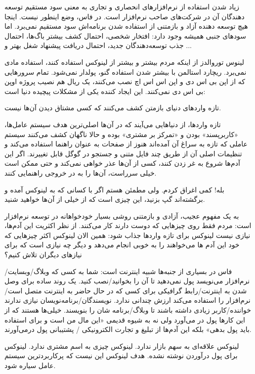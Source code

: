 زیاد شدن استفاده از نرم‌افزارهای انحصاری و تجاری به معنی سود مستقیم توسعه دهندگان آن در شرکت‌های صاحب نرم‌افزار است. در فاس، وضع اینطور نیست. اینجا هیچ توسعه دهنده آزاد و بازمتنی از استفاده شدن برنامه‌اش سود مستقیم نمی‌برد. اما سودهای جنبی همیشه وجود دارد: افتخار شخصی، احتمال کشف بیشتر باگ‌ها، احتمال جذب توسعه‌دهندگان جدید، احتمال دریافت پیشنهاد شغل بهتر و ...

لینوس توروالدز از اینکه مردم بیشتر و بیشتر از لینوکس استفاده کنند، استفاده مادی نمی‌برد. ریچارد استالمن با بیشتر شدن استفاده گنو، پولدار نمی‌شود. تمام سرورهایی که از اپن بی اس دی و اپن اس اس اچ نصب می‌کنند، یک ریال هم نصیب پروژه اوپن بی اس دی نمی‌کنند. این ایجاد کننده یکی از مشکلات‌ پیچیده دنیا است:

تازه واردهای دنیای بازمتن کشف می‌کنند که کسی مشتاق دیدن آن‌ها نیست.

تازه واردها، از دنیاهایی می‌آیند که در آن‌ها اصلی‌ترین هدف سیستم عامل‌ها، «کاربرپسند» بودن و «تمرکز بر مشتری» بوده و حالا ناگهان کشف می‌کنند سیستم عاملی که تازه به سراغ آن آمده‌اند هنوز از صفحات 
 به عنوان راهنما استفاده می‌کند و تنظیمات اصلی آن از طریق چند فایل متنی و جستجو در گوگل قابل تغییرند. اگر این آدم‌ها شروع به غر زدن کنند، کسی از آن‌ها عذر خواهی نمی‌کند و حتی ممکن است خیلی سرراست، آن‌ها را به در خروجی راهنمایی کنند.

بله! کمی اغراق کردم. ولی مطمئن هستم اگر با کسانی که به لینوکس آمده و برگشته‌اند گپ بزنید، این چیزی است که از خیلی از آن‌ها خواهید شنید.

به یک مفهوم عجیب، آزادی و بازمتنی روشی بسیار خودخواهانه در توسعه نرم‌افزار است: مردم فقط روی چیزهایی که دوست دارند کار می‌کنند. از نظر اکثریت این آدم‌ها، نیازی نیست لینوکس برای تازه واردها جذاب شود: همین الان لینوکس اکثر چیزهایی که خود این آدم ها می‌خواهند را به خوبی انجام می‌دهد و دیگر چه نیازی است که برای نیازهای دیگران تلاش کنیم؟

فاس در بسیاری از جنبه‌ها شبیه اینترنت است: شما به کسی که وبلاگ/وبسایت/نرم‌افزار می‌نویسد پول نمی‌دهید تا آن را بخوانید/نصب کنید. یک روند ساده برای وصل شدن به اینترنت/رابط گرافیکی برای کسی که در حال حاضر به اینترنت متصل است/نرم‌افزار را استفاده می‌کند ارزش چندانی ندارد. نویسندگان/برنامه‌نویسان نیازی ندارند خواننده/کاربر زیادی داشته باشند تا وبلاگ/برنامه شان را بنویسند. خیلی‌ها هستند که از این کارها پول در می‌آورد ولی نه به شیوه قدیمی «این مال من است و برای استفاده باید پول بدهی» بلکه این آدم‌ها از تبلیغ و تجارت الکترونیکی / پشتیبانی پول درمی‌آورند.

لینوکس علاقه‌ای به سهم بازار ندارد. لینوکس چیزی به اسم مشتری ندارد. لینوکس برای پول درآوردن نوشته نشده. هدف لینوکس این نیست که پرکاربردترین سیستم عامل سیاره شود.

